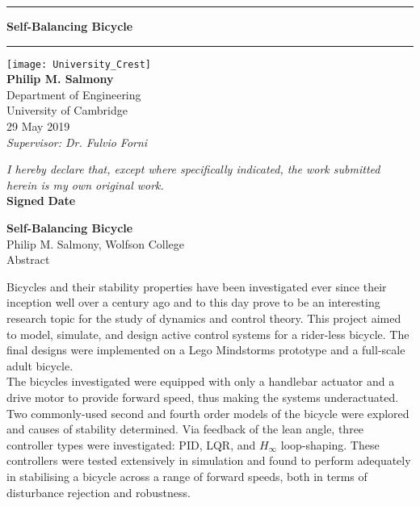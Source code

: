 \begin{titlepage}
	\begin{center}
		\hrule
		\vspace{0.5cm}
		\Huge{\textbf{Self-Balancing Bicycle}} \\
		\vspace{0.5cm}
		\hrule
		\vspace{3cm}
		\texttt{[image: University\_Crest]} \\
		\vspace{3cm}
		\large{\textbf{Philip M. Salmony} \\
		Department of Engineering \\
		University of Cambridge} \\
		\vspace{1.5cm}
		29 May 2019 \\
		\vspace{1.5cm}
		\textit{Supervisor: Dr. Fulvio Forni}
	\end{center}

\vfill

\textit{I hereby declare that, except where specifically indicated, the work submitted herein is my own original work.} \\

\textbf{Signed} \hspace{0.5\textwidth} \textbf{Date}


\end{titlepage}

\newpage
{}

\begin{center}
	\Large{\textbf{Self-Balancing Bicycle}} \\
	\large{Philip M. Salmony, Wolfson College} \\
	\large{Abstract}
\end{center}

\vspace{0.5cm}

Bicycles and their stability properties have been investigated ever since their inception well over a century ago and to this day prove to be an interesting research topic for the study of dynamics and control theory. This project aimed to model, simulate, and design active control systems for a rider-less bicycle. The final designs were implemented on a Lego Mindstorms prototype and a full-scale adult bicycle. \\

The bicycles investigated were equipped with only a handlebar actuator and a drive motor to provide forward speed, thus making the systems underactuated. Two commonly-used second and fourth order models of the bicycle were explored and causes of stability determined. Via feedback of the lean angle, three controller types were investigated: PID, LQR, and $H_{\infty}$ loop-shaping. These controllers were tested extensively in simulation and found to perform adequately in stabilising a bicycle across a range of forward speeds, both in terms of disturbance rejection and robustness. \\

